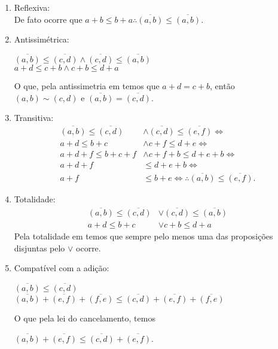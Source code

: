 \documentclass[../main.tex]{subfiles}
\begin{document}
\begin{dem}
    \begin{enumerate}[label=(\roman*)]
        \item Reflexiva: \\
            De fato ocorre que $a+b \leq b+a \therefore \overline{(a,b)} \leq \overline{(a,b)}$.
        
        \item Antissimétrica: 
            \begin{center}
                $\overline{(a,b)} \leq \overline{(c,d)} \land \overline{(c,d)} \leq \overline{(a,b)}$ \\
                $a+d \leq c+b \land c+b \leq d+a$
            \end{center}
            O que, pela antissimetria em \N temos que $a+d = c+b$, então $(a,b) \sim (c,d)$ e $\overline{(a,b)} = \overline{(c,d)} $.
        
        \item Transitiva: 
        \begin{align*}
            \overline{(a,b)} \leq \overline{(c,d)} & \land \overline{(c,d)} \leq \overline{(e,f)} \iff \\
            a+d \leq b+c & \land c+f \leq d+e \iff \\
            a+d+f \leq b + c + f & \land c + f + b \leq d + e + b \iff \\
            a + d + f & \leq d + e + b \iff\\
            a + f & \leq b + e \iff
            \therefore \overline{(a,b)} \leq \overline{(e,f)}.
        \end{align*}
            
        \item Totalidade: 
        \begin{align*}
            \overline{(a,b)} \leq \overline{(c,d)} &\lor \overline{(c,d)} \leq \overline{(a,b)} \\ 
            a+d \leq b+c &\lor c+b \leq d+a   
        \end{align*}
        Pela totalidade em \N temos que sempre pelo menos uma das proposições disjuntas pelo $\lor$ ocorre.
        
        \item Compatível com a adição: \\
        \begin{center}
            $\overline{(a,b)} \leq \overline{(c,d)}$ \\
            $\overline{(a,b)} + \overline{(e,f)} + \overline{(f,e)} \leq \overline{(c,d)} + \overline{(e,f)} + \overline{(f,e)}$
        \end{center}
        O que pela lei do cancelamento, temos \\
        \begin{center}
            $\overline{(a,b)} + \overline{(e,f)} \leq \overline{(c,d)} + \overline{(e,f)}$.
        \end{center}
        

\end{enumerate}
\end{dem}
\end{document}
